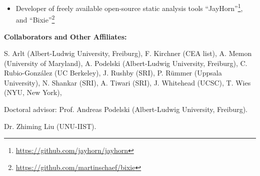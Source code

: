 \documentclass{article}
\begin{document}
\begin{itemize}
\item Developer of freely available open-source  static analysis tools ``JayHorn''\footnote{\url{https://github.com/jayhorn/jayhorn}}, and ``Bixie''\footnote{\url{https://github.com/martinschaef/bixie}}


\end{itemize}

\noindent
{\bf Collaborators and Other Affiliates:} 

\begin{description}
\itemsep=0in
\item[{\bf Recent Collaborators:}]
S. Arlt (Albert-Ludwig University, Freiburg),
F. Kirchner (CEA list),
A. Memon (University of Maryland),
A. Podelski (Albert-Ludwig University, Freiburg),
C. Rubio-Gonz\'alez (UC Berkeley),
J. Rushby (SRI),
P. R\"ummer (Uppsala University),
N. Shankar (SRI),
A. Tiwari (SRI),
J. Whitehead (UCSC),
T. Wies (NYU, New York),
\item[{\bf Advisor:}]  Doctoral advisor: Prof. Andreas Podelski
(Albert-Ludwig University, Freiburg).

\item[{\bf Postgraduate-Scholar Sponsor:}] Dr. Zhiming Liu (UNU-IIST).
\end{description}
\end{document}
